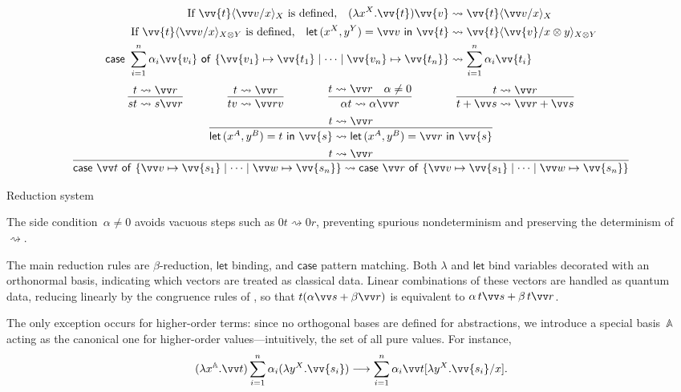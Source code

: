 \documentclass[runningheads,orivec,envcountsame,envcountsect]{llncs}
\newcommand\lra{\longrightarrow}
\newcommand\ansubst[2]{\ensuremath{\langle #1 \rangle_{#2}}}
\newcommand\AbsBasis{\ensuremath{\mathbb{A}}}
\def\Pair#1#2{(#1,#2)} %
\def\Lam#1#2#3{\lambda#1^{#2}{.}#3} %
\def\letkeyword{\mathsf{let}}
\def\inkeyword{\mathsf{in}}
\def\LetP#1#2#3#4#5#6{\letkeyword\,\Pair{#1^{#2}}{#3^{#4}}=#5~\inkeyword~#6}
\def\gencase#1#2#3#4#5{\ensuremath{\mathsf{case}~#1~\mathsf{of}~\{#2\mapsto #4 \mid \dotsb \mid #3\mapsto #5\}}}
\def\lraneq{\rightsquigarrow}
\begin{document}
\begin{table}[t]
  \begin{align*}
    \text{If }\vv{t}\ansubst{\vv v/x}{X}\text{ is defined,}\quad
    (\Lam{x}{X}{\vv{t}})\vv{v}
    &\lraneq \vv{t}\ansubst{\vv v/x}{X}\\
    \text{If }\vv{t}\ansubst{\vv v/x}{X\otimes Y}\text{ is defined,}\quad
    \LetP{x}{X}{y}{Y}{\vv v}{\vv{t}}
    &\lraneq \vv{t}\ansubst{\vv{v}/x\otimes y}{X\otimes Y}\\
    \gencase{\sum_{i=1}^{n}\alpha_i \vv{v_i}}{\vv{v_1}}{\vv{v_n}}{\vv{t_1}}{\vv{t_n}}
    &\lraneq \sum_{i=1}^{n}\alpha_i \vv{t_i}
  \end{align*}
  \[
    \begin{array}{c}
      \infer{st\lraneq s\vv r}{t\lraneq \vv r}
      \qquad\qquad
      \infer{tv\lraneq \vv rv}{t\lraneq\vv r}
      \qquad\qquad
      \infer{\alpha t\lraneq \alpha \vv r}{t\lraneq\vv r & \alpha\neq 0}
      \qquad\qquad
      \infer{t+\vv s\lraneq\vv r+\vv s}{t\lraneq\vv r}
      \\[5pt]
      \infer{\LetP{x}{A}{y}{B}{t}{\vv{s}}\lraneq
      \LetP{x}{A}{y}{B}{\vv r}{\vv{s}}}{t\lraneq \vv r} 
      \\[5pt]
      \infer{\gencase{\vv t}{\vv v}{\vv w}{\vv{s_1}}{\vv{s_n}}\lraneq
      \gencase{\vv r}{\vv v}{\vv w}{\vv{s_1}}{\vv{s_n}}}{t\lraneq \vv r}
    \end{array}
  \]
  \caption{Reduction system}
  \label{tab:Reduction}
\end{table}

The side condition~$\alpha\neq0$ avoids vacuous steps such as
$0t\lraneq0r$, preventing spurious nondeterminism and preserving the
determinism of~$\lraneq$.

The main reduction rules are $\beta$-reduction, $\mathsf{let}$ binding, and
$\mathsf{case}$ pattern matching.  
Both $\lambda$ and $\mathsf{let}$ bind variables decorated with an orthonormal
basis, indicating which vectors are treated as classical data.  Linear
combinations of these vectors are handled as quantum data, reducing linearly by
the congruence rules of , so that
$t(\alpha\vv s+\beta\vv r)$ is equivalent to
$\alpha\,t\vv s+\beta\,t\vv r$.

The only exception occurs for higher-order terms: since no orthogonal bases are
defined for abstractions, we introduce a special basis~$\AbsBasis$ acting as
the canonical one for higher-order values—intuitively, the set of all pure
values.  For instance,
\[
  (\Lam{x}{\AbsBasis}{\vv t})
  \sum_{i=1}^{n}\alpha_i(\Lam{y}{X}{\vv{s_i}})
  \lra
  \sum_{i=1}^n\alpha_i\vv t[\Lam{y}{X}{\vv{s_i}}/x].
\]
\end{document}
